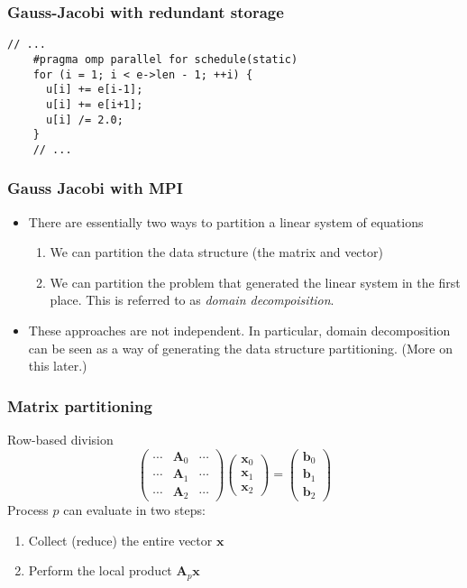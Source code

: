 \begin{frame}[fragile]
  \frametitle{Gauss-Jacobi with redundant storage}
\begin{lstlisting}[style=c, basicstyle=\ttfamily\footnotesize]
    // ...
    #pragma omp parallel for schedule(static)
    for (i = 1; i < e->len - 1; ++i) {
      u[i] += e[i-1];
      u[i] += e[i+1];
      u[i] /= 2.0;
    }
    // ...
\end{lstlisting}
\end{frame}

\begin{frame}
  \frametitle{Gauss Jacobi with MPI}
  \begin{itemize}
  \item There are essentially two ways to partition a linear system of equations
    \begin{enumerate}
    \item We can partition the data structure (the matrix and vector)
    \item We can partition the problem that generated the linear system in the
      first place. This is referred to as \emph{domain decompoisition}.
    \end{enumerate}
  \item These approaches are not independent. In particular, domain
    decomposition can be seen as a way of generating the data structure
    partitioning. (More on this later.)
  \end{itemize}
\end{frame}

\begin{frame}
  \frametitle{Matrix partitioning}
  Row-based division
  \[
    \begin{pmatrix}
      \cdots & \bm A_0 & \cdots \\
      \cdots & \bm A_1 & \cdots \\
      \cdots & \bm A_2 & \cdots
    \end{pmatrix}
    \begin{pmatrix}
      \bm x_0 \\ \bm x_1 \\ \bm x_2
    \end{pmatrix}
    =
    \begin{pmatrix}
      \bm b_0 \\ \bm b_1 \\ \bm b_2
    \end{pmatrix}
  \]
  Process $p$ can evaluate in two steps:
  \begin{enumerate}
  \item Collect (reduce) the entire vector $\bm x$
  \item Perform the local product $\bm A_p \bm x$
  \end{enumerate}
\end{frame}

